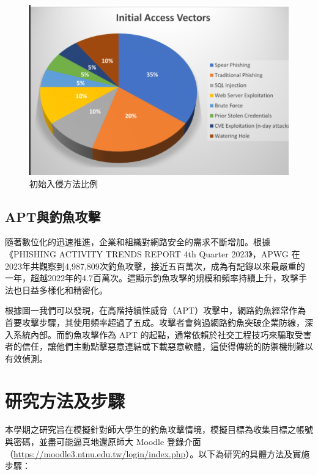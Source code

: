 \documentclass[a4paper,12pt]{article}
\begin{document}
\begin{figure}[ht!]
    \centering
    \includegraphics[width=1\textwidth]{initial-attack.png}
    \caption{初始入侵方法比例}
    \label{fig:fake_site}
\end{figure}

\subsection{APT與釣魚攻擊}
隨著數位化的迅速推進，企業和組織對網路安全的需求不斷增加。根據《PHISHING ACTIVITY TRENDS REPORT 4th Quarter 2023》，APWG 在2023年共觀察到4,987,809次釣魚攻擊，接近五百萬次，成為有記錄以來最嚴重的一年，超越2022年的4.7百萬次。這顯示釣魚攻擊的規模和頻率持續上升，攻擊手法也日益多樣化和精密化。\cite{apwg2023}

根據圖一我們可以發現，在高階持續性威脅（APT）攻擊中，網路釣魚經常作為首要攻擊步驟，其使用頻率超過了五成。攻擊者會夠過網路釣魚突破企業防線，深入系統內部。而釣魚攻擊作為 APT 的起點，通常依賴於社交工程技巧來騙取受害者的信任，讓他們主動點擊惡意連結或下載惡意軟體，這使得傳統的防禦機制難以有效偵測。


\section{研究方法及步驟}
本學期之研究旨在模擬針對師大學生的釣魚攻擊情境，模擬目標為收集目標之帳號與密碼，並盡可能逼真地還原師大 Moodle 登錄介面（\url{https://moodle3.ntnu.edu.tw/login/index.php}）。以下為研究的具體方法及實施步驟：
\end{document}

